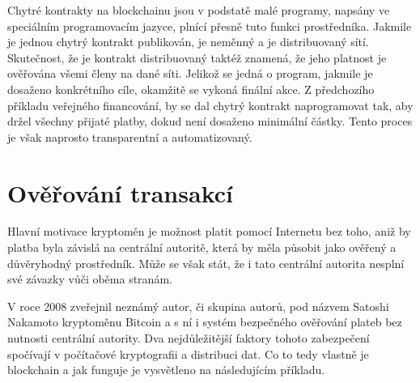 Chytré kontrakty na blockchainu jsou v podstatě malé programy, napsány ve speciálním programovacím jazyce, plnící přesně tuto funkci prostředníka.
Jakmile je jednou chytrý kontrakt publikován, je neměnný a je distribuovaný sítí. Skutečnost, že je kontrakt distribuovaný
taktéž znamená, že jeho platnost je ověřována všemi členy na dané síti.
Jelikož se jedná o program, jakmile je dosaženo konkrétního cíle, okamžitě se vykoná finální akce. Z předchozího příkladu veřejného
financování, by se dal chytrý kontrakt naprogramovat tak, aby držel všechny přijaté platby, dokud není dosaženo minimální částky.
Tento proces je však naprosto transparentní a automatizovaný.


\section{Ověřování transakcí}
\label{sec:BlockchainSecurity}
Hlavní motivace kryptoměn je možnost platit pomocí Internetu bez toho, aniž by platba byla závislá na centrální autoritě, která by měla
působit jako ověřený a důvěryhodný prostředník. Může se však stát, že i tato centrální autorita nesplní své závazky vůči oběma stranám.

V roce 2008 zveřejnil neznámý autor, či skupina autorů, pod názvem Satoshi Nakamoto kryptoměnu Bitcoin a s ní i systém bezpečného
ověřování plateb bez nutnosti centrální autority. Dva nejdůležitější faktory tohoto zabezpečení spočívají v počítačové kryptografii
a distribuci dat. Co to tedy vlastně je blockchain a jak funguje je vysvětleno na následujícím příkladu.

